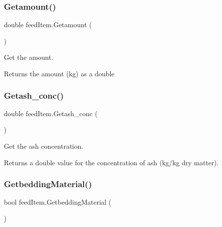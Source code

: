 \subsubsection{\texorpdfstring{Getamount()}{Getamount()}}
{\footnotesize\ttfamily double feed\+Item.\+Getamount (\begin{DoxyParamCaption}{ }\end{DoxyParamCaption})\hspace{0.3cm}{\ttfamily [inline]}}



Get the amount. 

\begin{DoxyReturn}{Returns}
the amount (kg) as a double 
\end{DoxyReturn}
\mbox{\label{classfeed_item_a2250428bfac6980e46db357f192d979e}} 
\subsubsection{\texorpdfstring{Getash\_conc()}{Getash\_conc()}}
{\footnotesize\ttfamily double feed\+Item.\+Getash\+\_\+conc (\begin{DoxyParamCaption}{ }\end{DoxyParamCaption})\hspace{0.3cm}{\ttfamily [inline]}}



Get the ash concentration. 

\begin{DoxyReturn}{Returns}
a double value for the concentration of ash (kg/kg dry matter). 
\end{DoxyReturn}
\mbox{\label{classfeed_item_a0c317f7da87544acbc40bde36f78dd76}} 
\subsubsection{\texorpdfstring{GetbeddingMaterial()}{GetbeddingMaterial()}}
{\footnotesize\ttfamily bool feed\+Item.\+Getbedding\+Material (\begin{DoxyParamCaption}{ }\end{DoxyParamCaption})\hspace{0.3cm}{\ttfamily [inline]}}



